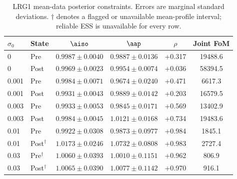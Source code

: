 \begin{table}[t]
\caption{\label{tab:baseline_LRG1}LRG1 mean-data posterior constraints. Errors are marginal standard deviations. $\dagger$ denotes a flagged or unavailable mean-profile interval; reliable ESS is unavailable for every row.}
\begin{ruledtabular}
\begin{tabular}{llcccc}
$\sigma_0$ & State & $\aiso$ & $\aap$ & $\rho$ & Joint FoM \\
\hline
0 & Pre & $0.9987\pm0.0040$ & $0.9887\pm0.0136$ & +0.317 & 19488.6 \\
0 & Post & $0.9969\pm0.0023$ & $0.9954\pm0.0074$ & +0.036 & 58394.5 \\
0.001 & Pre & $0.9984\pm0.0071$ & $0.9674\pm0.0240$ & +0.471 & 6617.3 \\
0.001 & Post & $0.9931\pm0.0043$ & $0.9889\pm0.0142$ & +0.203 & 16579.5 \\
0.003 & Pre & $0.9933\pm0.0053$ & $0.9845\pm0.0171$ & +0.569 & 13402.9 \\
0.003 & Post & $0.9984\pm0.0045$ & $1.0121\pm0.0168$ & +0.734 & 19483.6 \\
0.01 & Pre & $0.9922\pm0.0308$ & $0.9873\pm0.0977$ & +0.984 & 1845.1 \\
0.01 & Post$^{\dagger}$ & $1.0173\pm0.0246$ & $1.0732\pm0.0808$ & +0.983 & 2727.4 \\
0.03 & Pre$^{\dagger}$ & $1.0060\pm0.0393$ & $1.0010\pm0.1151$ & +0.962 & 806.9 \\
0.03 & Post$^{\dagger}$ & $1.0065\pm0.0390$ & $1.0077\pm0.1142$ & +0.970 & 916.1 \\
\end{tabular}
\end{ruledtabular}
\end{table}

